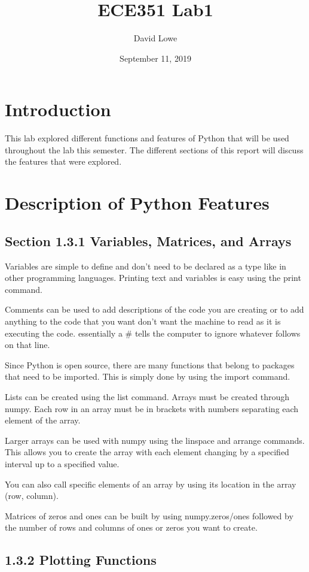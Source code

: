 \documentclass{article}
\title{ECE351 Lab1}
\author{David Lowe }
\date{September 11, 2019}
\begin{document}
\maketitle

\section{Introduction}
This lab explored different functions and features of Python that will be used throughout the lab this semester. The different sections of this report will discuss the features that were explored.

\section{Description of Python Features}
\subsection{Section 1.3.1 Variables, Matrices, and Arrays}

Variables are simple to define and don't need to be declared as a type like in other programming languages. Printing text and variables is easy using the print command.

Comments can be used to add descriptions of the code you are creating or to add anything to the code that you want don't want the machine to read as it is executing the code. essentially a \# tells the computer to ignore whatever follows on that line.

Since Python is open source, there are many functions that belong to packages that need to be imported. This is simply done by using the import command.

Lists can be created using the list command. Arrays must be created through numpy. Each row in an array must be in brackets with numbers separating each element of the array.

Larger arrays can be used with numpy using the linspace and arrange commands. This allows you to create the array with each element changing by a specified interval up to a specified value.

You can also call specific elements of an array by using its location in the array (row, column).

Matrices of zeros and ones can be built by using numpy.zeros/ones followed by the number of rows and columns of ones or zeros you want to create.

\subsection{1.3.2 Plotting Functions}
\end{document}
